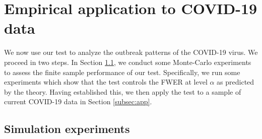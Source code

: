\documentclass[a4paper,12pt]{article}
\numberwithin{equation}{section}
\begin{document}
\section{Empirical application to COVID-19 data}\label{sec:empirics} 


We now use our test to analyze the outbreak patterns of the COVID-19 virus. We proceed in two steps. In Section \ref{subsec:sim}, we conduct some Monte-Carlo experiments to assess the finite sample performance of our test. Specifically, we run some experiments which show that the test controls the FWER at level $\alpha$ as predicted by the theory. Having established this, we then apply the test to a sample of current COVID-19 data in Section \ref{subsec:app}. 


\subsection{Simulation experiments}\label{subsec:sim}
\end{document}
